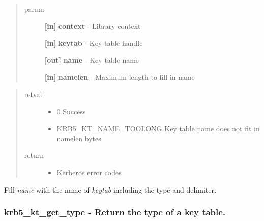 \documentclass[letterpaper,10pt,english]{sphinxmanual}
\begin{document}
\begin{quote}\begin{description}
\item[{param}] \leavevmode
\textbf{{[}in{]}} \textbf{context} - Library context

\textbf{{[}in{]}} \textbf{keytab} - Key table handle

\textbf{{[}out{]}} \textbf{name} - Key table name

\textbf{{[}in{]}} \textbf{namelen} - Maximum length to fill in name

\end{description}\end{quote}
\begin{quote}\begin{description}
\item[{retval}] \leavevmode\begin{itemize}
\item {} 
0   Success

\item {} 
KRB5\_KT\_NAME\_TOOLONG   Key table name does not fit in namelen bytes

\end{itemize}

\item[{return}] \leavevmode\begin{itemize}
\item {} 
Kerberos error codes

\end{itemize}

\end{description}\end{quote}

Fill \emph{name} with the name of \emph{keytab} including the type and delimiter.


\subsubsection{krb5\_kt\_get\_type -  Return the type of a key table.}
\label{appdev/refs/api/krb5_kt_get_type:krb5-kt-get-type-return-the-type-of-a-key-table}\label{appdev/refs/api/krb5_kt_get_type::doc}

\begin{fulllineitems}
\label{appdev/refs/api/krb5_kt_get_type:krb5_kt_get_type}
\end{fulllineitems}
\end{document}
